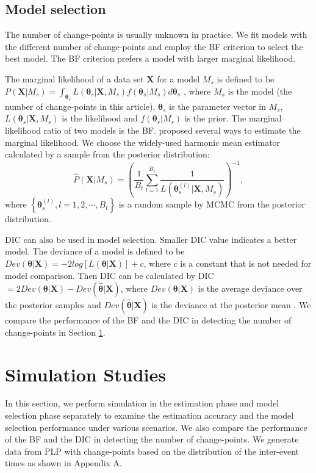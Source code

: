 \documentclass[12pt]{article}
\numberwithin{equation}{section}
\begin{document}
\subsection{Model selection}
The number of change-points is usually unknown in practice. We fit models with the different number of change-points and employ the BF criterion to select the best model. The BF criterion prefers a model with larger marginal likelihood.  

The marginal likelihood of a data set $\pmb X$ for a model $M_s$ is defined to be   
$P(\pmb X|M_s) = \int_{\pmb{\theta}_s}L(\pmb\theta_s |\pmb X, M_s)f(\pmb\theta_s|M_s)d\pmb{\theta}_s$ \citep{Raftery1996}, where $M_s$ is the model (the number of change-points in this article), $\pmb{\theta}_s$ is the parameter vector in $M_s$, $L(\pmb\theta_s |\pmb X, M_s)$ is the likelihood and $f(\pmb\theta_s|M_s)$ is the prior. The marginal likelihood ratio of two models is the BF.  \citet{Raftery1996} proposed several ways to estimate the marginal likelihood. We choose the widely-used harmonic mean estimator calculated by a sample from the posterior distribution:
\begin{equation}\label{eqn:LXM}
\hat P(\pmb X|M_s) = (\frac{1}{B_t}\sum\limits_{l=1}^{B_t}\frac{1}{L(\pmb\theta_s^{(l)}|\pmb X, M_s)})^{-1},
\end{equation}
where $\left\lbrace \pmb\theta_s^{(l)}, l = 1, 2, \cdots, B_t\right\rbrace $ is a random sample by MCMC from the posterior distribution. 

DIC \citep{Spieg2002} can also be used in model selection. Smaller DIC value indicates a better model. The deviance of a model is defined to be $Dev(\pmb\theta|\pmb X) = -2 log[L(\pmb\theta|\pmb X)] + c$, where $c$ is a constant that is not needed for model comparison. Then DIC can be calculated by DIC $ = 2\overline {Dev}(\pmb\theta|\pmb X)-Dev(\hat{\pmb\theta}|\pmb X)$, where $\overline{Dev}(\pmb\theta|\pmb X)$ is the average deviance over the posterior samples and  $Dev(\hat{\pmb\theta}|\pmb X)$ is the deviance at the posterior mean \citep[p. 188]{Gelman2004}. We compare the performance of the  BF and the DIC in detecting the number of change-points in Section \ref{sec:simulation}.
\section{Simulation Studies}\label{sec:simulation}
In this section, we perform simulation in the estimation phase and model selection phase separately to examine the estimation accuracy and the model selection performance under various scenarios. We also compare the performance of the BF and the DIC in detecting the number of change-points. We generate data from PLP with change-points based on the distribution of the inter-event times \citep{Klein1984} as shown in Appendix A.
\end{document}
